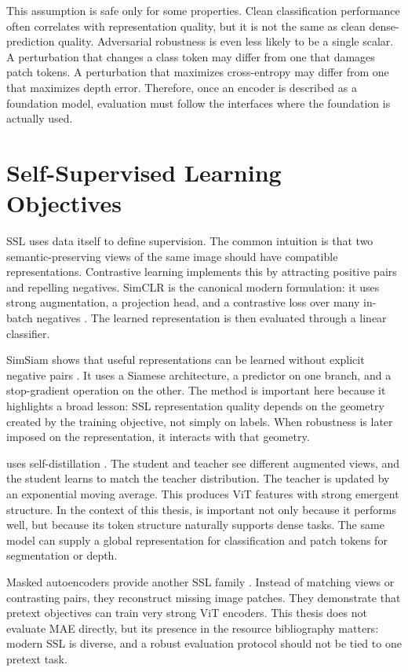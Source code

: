 This assumption is safe only for some properties. Clean classification performance often correlates with representation quality, but it is not the same as clean dense-prediction quality. Adversarial robustness is even less likely to be a single scalar. A perturbation that changes a class token may differ from one that damages patch tokens. A perturbation that maximizes cross-entropy may differ from one that maximizes depth error. Therefore, once an encoder is described as a foundation model, evaluation must follow the interfaces where the foundation is actually used.

\section{Self-Supervised Learning Objectives}

SSL uses data itself to define supervision. The common intuition is that two semantic-preserving views of the same image should have compatible representations. Contrastive learning implements this by attracting positive pairs and repelling negatives. SimCLR is the canonical modern formulation: it uses strong augmentation, a projection head, and a contrastive loss over many in-batch negatives \parencite{chen2020simple}. The learned representation is then evaluated through a linear classifier.

SimSiam shows that useful representations can be learned without explicit negative pairs \parencite{simsiam}. It uses a Siamese architecture, a predictor on one branch, and a stop-gradient operation on the other. The method is important here because it highlights a broad lesson: SSL representation quality depends on the geometry created by the training objective, not simply on labels. When robustness is later imposed on the representation, it interacts with that geometry.

\DINO uses self-distillation \parencite{caron2021dino}. The student and teacher see different augmented views, and the student learns to match the teacher distribution. The teacher is updated by an exponential moving average. This produces ViT features with strong emergent structure. In the context of this thesis, \DINO is important not only because it performs well, but because its token structure naturally supports dense tasks. The same model can supply a global representation for classification and patch tokens for segmentation or depth.

Masked autoencoders provide another SSL family \parencite{mae}. Instead of matching views or contrasting pairs, they reconstruct missing image patches. They demonstrate that pretext objectives can train very strong ViT encoders. This thesis does not evaluate MAE directly, but its presence in the resource bibliography matters: modern SSL is diverse, and a robust evaluation protocol should not be tied to one pretext task.

